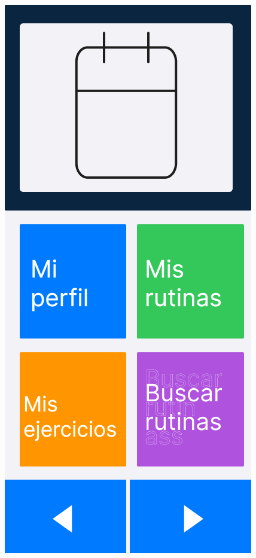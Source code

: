 \begin{figure}[H]
\begin{minipage}[b]{0.35\textwidth}
    \includegraphics[width=\textwidth]{fotos/MainMenu.png}

\end{minipage}
\end{figure}
